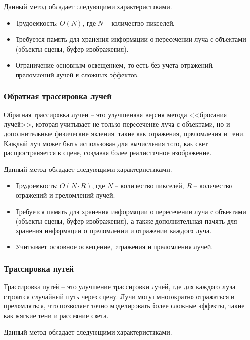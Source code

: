Данный метод обладает следующими характеристиками.

\begin{itemize}
	\item Трудоемкость: $O(N)$, где $N$ -- количество пикселей.
	\item Требуется память для хранения информации о пересечении луча с объектами (объекты сцены, буфер изображения).
	\item Ограничение основным освещением, то есть без учета отражений, преломлений лучей и сложных эффектов.
\end{itemize}

\subsubsection{Обратная трассировка лучей}

Обратная трассировка лучей -- это улучшенная версия метода <<бросания лучей>>, которая учитывает не только пересечение луча с объектами, но и дополнительные физические явления, такие как отражения, преломления и тени. Каждый луч может быть использован для вычисления того, как свет распространяется в сцене, создавая более реалистичное изображение.

Данный метод обладает следующими характеристиками.

\begin{itemize}
	\item Трудоемкость: $O(N \cdot R)$, где $N$ -- количество пикселей, $R$ -- количество отражений и преломлений лучей.
	\item Требуется память для хранения информации о пересечении луча с объектами (объекты сцены, буфер изображения), а также дополнительная память для хранения информации о преломлении и отражении каждого луча.
	\item Учитывает основное освещение, отражения и преломления лучей.
\end{itemize}

\subsubsection{Трассировка путей}

Трассировка путей -- это улучшение трассировки лучей, где для каждого луча строится случайный путь через сцену. Лучи могут многократно отражаться и преломляться, что позволяет точно моделировать более сложные эффекты, такие как мягкие тени и рассеяние света.

Данный метод обладает следующими характеристиками.


